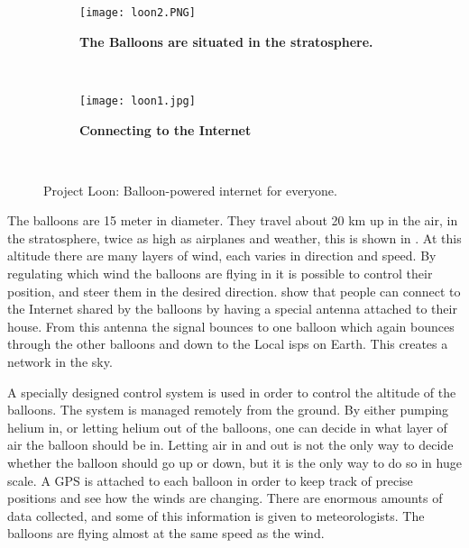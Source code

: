 \begin{figure}
        \centering
        \begin{subfigure}[t]{0.43\textwidth}
                \texttt{[image: loon2.PNG]}
                \caption[The Balloons are situated in the stratosphere]{\textbf{The Balloons are situated in the stratosphere.}} 
                \label{fig:loonStratosphere}
        \end{subfigure}%
        ~ %
        \begin{subfigure}[t]{0.415\textwidth}
                \texttt{[image: loon1.jpg]}
               \caption[Connecting to the Internet]							{\textbf{Connecting to the Internet}} 
                \label{fig:loonConnect}
        \end{subfigure}
        ~ %
        \caption{Project Loon: Balloon-powered internet for everyone.}\label{fig:loon}
\end{figure}



The balloons are 15 meter in diameter. They travel about 20 km up in the air, in the stratosphere, twice as high as airplanes and weather, this is shown in . At this altitude there are many layers of wind, each varies in direction and speed. By regulating which wind the balloons are flying in it is possible to control their position, and steer them in the desired direction.  show that people can connect to the Internet shared by the balloons by having a special antenna attached to their house. From this antenna the signal bounces to one balloon which again bounces through the other balloons and down to the Local \glspl{isp} on Earth. This creates a network in the sky. 

A specially designed control system is used in order to control the altitude of the balloons. The system is managed remotely from the ground. By either pumping helium in, or letting helium out of the balloons, one can decide in what layer of air the balloon should be in. Letting air in and out is not the only way to decide whether the balloon should go up or down, but it is the only way to do so in huge scale. A GPS is attached to each balloon in order to keep track of precise positions and see how the winds are changing. There are enormous amounts of data collected, and some of this information is given to meteorologists. The balloons are flying almost at the same speed as the wind.  

